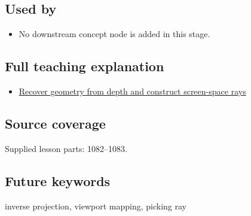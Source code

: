 \subsection{Used by}\label{appendix-f1a6d43e80d1-used-by}

\begin{itemize}
\tightlist
\item
  No downstream concept node is added in this stage.
\end{itemize}

\subsection{Full teaching explanation}\label{appendix-f1a6d43e80d1-full-teaching-explanation}

\begin{itemize}
\tightlist
\item
  \hyperref[02-foundations-ii-ch035-recover-geometry-from-depth-and-construct-screen-space-rays]{Recover geometry from depth and construct screen-space rays}
\end{itemize}

\subsection{Source coverage}\label{appendix-f1a6d43e80d1-source-coverage}

Supplied lesson parts: 1082--1083.

\subsection{Future keywords}\label{appendix-f1a6d43e80d1-future-keywords}

inverse projection, viewport mapping, picking ray
